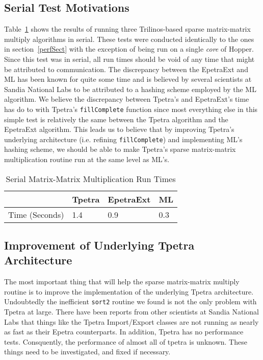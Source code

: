 \documentclass[pdf,12pt]{SANDreport}
\begin{document}
\subsection{Serial Test Motivations}
Table~\ref{serialTable} shows the results of running three Trilinos-based sparse matrix-matrix multiply algorithms in 
serial. These tests were conducted identically to the ones in section~\ref{perfSect} with the exception of being run on a 
single \emph{core} of Hopper. Since this test was in serial, all run times should be void of any time that might be 
attributed to communication. The discrepancy between the EpetraExt and ML has been known for quite some time and 
is believed by several scientists at Sandia National Labs to be attributed to a hashing scheme employed by the ML algorithm.
We believe the discrepancy between Tpetra's and EpetraExt's time has do to with Tpetra's 
\verb!fillComplete! function since most everything else in this simple test 
is relatively the same between the Tpetra algorithm and the EpetraExt algorithm. This leads us to believe that
by improving Tpetra's underlying architecture (i.e. refining \verb!fillComplete!) and implementing ML's hashing
scheme, we should be able to make Tpetra's sparse matrix-matrix multiplication routine run at the same level as ML's.

\begin{table}
\centering
\begin{tabular}{ | l | l | l | l | }
\hline
 & Tpetra & EpetraExt & ML \\ \hline
Time (Seconds) & 1.4 & 0.9 & 0.3 \\ \hline
\end{tabular}
\caption{Serial Matrix-Matrix Multiplication Run Times}
\label{serialTable}
\end{table}

\subsection{Improvement of Underlying Tpetra Architecture}
The most important thing that will help the sparse matrix-matrix multiply routine is to improve the implementation of the
underlying Tpetra architecture. 
Undoubtedly the inefficient \verb!sort2! routine we found is not the only problem with Tpetra at large. There have been 
reports from other scientists at Sandia National Labs that things like the Tpetra Import/Export classes are not running as 
nearly as fast as their Epetra counterparts. In addition, Tpetra has no performance tests. Consquently, the performance of 
almost all of tpetra is unknown. These things need to be investigated, and fixed if necessary.
\end{document}
